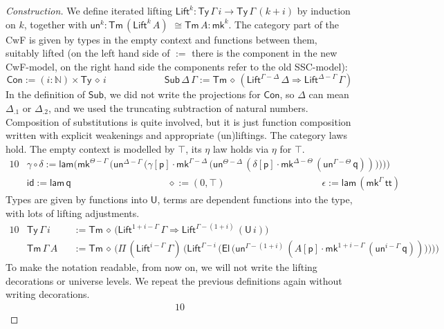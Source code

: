 \documentclass[a4paper,UKenglish,cleveref, autoref, thm-restate]{lipics-v2021}
\newcommand{\ra}{\rightarrow}
\newcommand{\Ra}{\Rightarrow}
\newcommand{\Ty}{\mathsf{Ty}}
\newcommand{\Tm}{\mathsf{Tm}}
\newcommand{\Con}{\mathsf{Con}}
\newcommand{\Sub}{\mathsf{Sub}}
\newcommand{\p}{\mathsf{p}}
\newcommand{\q}{\mathsf{q}}
\newcommand{\N}{\mathbb{N}}
\newcommand{\lam}{\mathsf{lam}}
\newcommand{\U}{\mathsf{U}}
\newcommand{\El}{\mathsf{El}}
\renewcommand{\tt}{\mathsf{tt}}
\newcommand{\Lift}{\mathsf{Lift}}
\newcommand{\mk}{\mathsf{mk}}
\newcommand{\un}{\mathsf{un}}
\newcommand{\id}{\mathsf{id}}
\begin{document}
\begin{proof}[Construction]
  We define iterated lifting $\Lift^k :
  \Ty\,\Gamma\,i\ra\Ty\,\Gamma\,(k+i)$ by induction on $k$, together
  with $\un^k : \Tm\,(\Lift^k\,A)$ $\cong\Tm\,A : \mk^k$. The category %
  part of the CwF is given by types in the empty context and functions
  between them, suitably lifted (on the left hand side of $:=$ there
  is the component in the new CwF-model, on the right hand side the
  components refer to the old SSC-model):
  \[
    \Con := (i:\N)\times\Ty\,\diamond\,i \hspace{6em}
    \Sub\,\Delta\,\Gamma := \Tm\,\diamond\,(\Lift^{\Gamma-\Delta}\,\Delta\Ra\Lift^{\Delta-\Gamma}\,\Gamma)
  \]
  In the definition of $\Sub$, we did not write the projections for
  $\Con$, so $\Delta$ can mean $\Delta_{.1}$ or $\Delta_{.2}$, and we used the truncating subtraction of
  natural numbers. Composition of substitutions is quite involved, but
  it is just function composition written with explicit weakenings and
  appropriate (un)liftings. The category laws hold. The empty context is
  modelled by $\top$, its $\eta$ law holds via $\eta$ for $\top$.
  \begin{alignat*}{10}
    & \gamma\circ\delta := \lam\Bigg(\mk^{\Theta-\Gamma}\,\bigg(\un^{\Delta-\Gamma}\,\Big(\gamma[\p]\cdot\mk^{\Gamma-\Delta}\,\big(\un^{\Theta-\Delta}\,(\delta[\p]\cdot\mk^{\Delta-\Theta}\,(\un^{\Gamma-\Theta}\,\q))\big)\Big)\bigg)\Bigg) \\
    & \id := \lam\,\q \hspace{10em} \diamond := (0,\top) \hspace{10em} \epsilon := \lam\,(\mk^\Gamma\,\tt)
  \end{alignat*}
  Types are given by functions into $\U$, terms are dependent
  functions into the type, with lots of lifting adjustments.
  \begin{alignat*}{10}
    & \Ty\,\Gamma\,i && := \Tm\,\diamond\,\big(\Lift^{1+i-\Gamma}\,\Gamma\Ra\Lift^{\Gamma-(1+i)}\,(\U\,i)\big) \\
    & \Tm\,\Gamma\,A && := \Tm\,\diamond\,\Bigg(\Pi\,(\Lift^{i-\Gamma}\,\Gamma)\,\bigg(\Lift^{\Gamma-i}\,\Big(\El\,\big(\un^{\Gamma-(1+i)}\,(A[\p]\cdot\mk^{1+i-\Gamma}\,(\un^{i-\Gamma}\,\q))\big)\Big)\bigg)\Bigg)
  \end{alignat*}
  To make the notation readable, from now on, we will not write the
  lifting decorations or universe levels. We repeat the previous
  definitions again without writing decorations.
  \begin{alignat*}{10}

\end{alignat*}
\end{proof}
\end{document}
